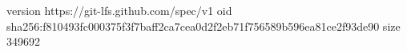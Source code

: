version https://git-lfs.github.com/spec/v1
oid sha256:f810493fc000375f3f7baff2ca7cea0d2f2eb71f756589b596ea81ce2f93de90
size 349692

